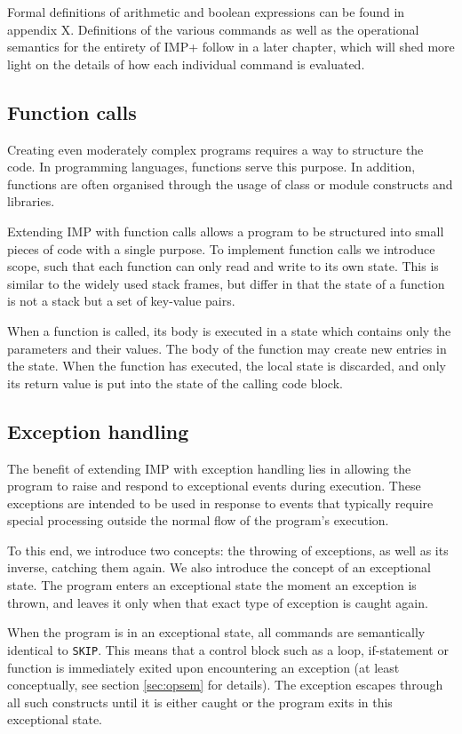 Formal definitions of arithmetic and boolean expressions can be found in appendix X. Definitions of the various commands as well as the operational semantics for the entirety of IMP+ follow in a later chapter, which will shed more light on the details of how each individual command is evaluated.

\subsection{Function calls}

Creating even moderately complex programs requires a way to structure the code. In programming languages, functions serve this purpose. In addition, functions are often organised through the usage of class or module constructs and libraries.

Extending IMP with function calls allows a program to be structured into small pieces of code with a single purpose. To implement function calls we introduce scope, such that each function can only read and write to its own state. This is similar to the widely used stack frames, but differ in that the state of a function is not a stack but a set of key-value pairs.

When a function is called, its body is executed in a state which contains only the parameters and their values. The body of the function may create new entries in the state. When the function has executed, the local state is discarded, and only its return value is put into the state of the calling code block.

\subsection{Exception handling}

The benefit of extending IMP with exception handling lies in allowing the program to raise and respond to exceptional events during execution. These exceptions are intended to be used in response to events that typically require special processing outside the normal flow of the program’s execution.

To this end, we introduce two concepts: the throwing of exceptions, as well as its inverse, catching them again. We also introduce the concept of an exceptional state. The program enters an exceptional state the moment an exception is thrown, and leaves it only when that exact type of exception is caught again.

When the program is in an exceptional state, all commands are semantically identical to \verb|SKIP|. This means that a control block such as a loop, if-statement or function is immediately exited upon encountering an exception (at least conceptually, see section \ref{sec:opsem}  for details). The exception escapes through all such constructs until it is either caught or the program exits in this exceptional state.

